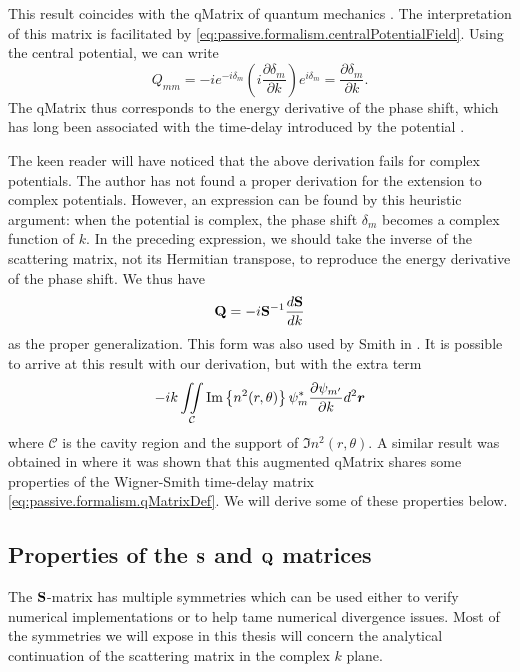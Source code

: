This result coincides with the \gls{qMatrix} of quantum 
mechanics \cite{SMI1960}. The interpretation of this 
matrix is facilitated by \eqref{eq:passive.formalism.centralPotentialField}. 
Using the central potential, we can write
  \begin{equation}
    Q_{mm} = -ie^{-i\delta_m}\left(i\frac{\partial\delta_m}{\partial k}\right)e^{i\delta_m} = \frac{\partial\delta_m}{\partial k}.
  \end{equation}
The \gls{qMatrix} thus corresponds to the energy derivative of the 
phase shift, which has long been associated with the time-delay
introduced by the potential \cite{EIS1948,SMI1960,NUS1972,CAR2002,NUS1997,HAB2007}. 

The keen reader will have noticed that the above derivation
fails for complex potentials. The author has not found a proper
derivation for the extension to complex potentials. However, 
an expression can be found by this heuristic argument:
when the potential is complex, the phase shift $\delta_m$
becomes a complex function of $k$. In the preceding expression, 
we should take the inverse of the scattering matrix, not its Hermitian
transpose, to reproduce the energy derivative of the phase shift.
We thus have
  \begin{equation}
   \mathbf{Q} = -i\mathbf{S}^{-1}\frac{d\mathbf{S}}{dk}
  \end{equation}
as the proper generalization. This form was also used by Smith in
\cite{SMI1960}.
It is possible to arrive at this result with our derivation, but
with the extra term
	\begin{equation}
		-ik\mathop{\iint}_\mathcal{C}\text{Im}\left\{n^2(r,\theta)\right\}\psi_m^*\frac{\partial\psi_{m'}}{\partial k}d^2\boldsymbol{r}
	\end{equation}
where $\mathcal{C}$ is the cavity region and the support of 
$\Im{n^2(r,\theta)}$. A similar result was obtained in 
\cite{MAR1975} where it was shown that this augmented \gls{qMatrix}
shares some properties of the Wigner-Smith time-delay matrix 
\eqref{eq:passive.formalism.qMatrixDef}. We will derive some of
these properties below. 

\subsection{Properties of the $\mathbf{S}$ and $\mathbf{Q}$ matrices}
The $\mathbf{S}$-matrix has multiple symmetries which can be used 
either to verify numerical implementations or to help tame 
numerical divergence issues. Most of the symmetries we will
expose in this thesis will concern the analytical continuation
of the scattering matrix in the complex $k$ plane. 

